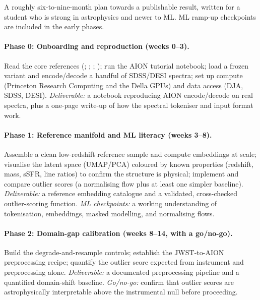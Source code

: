 \documentclass[onecolumn,astrosymb,tighten,longbib,trackchanges]{aastex7} %
\newcommand{\aion}{\textsc{AION}\xspace}
\begin{document}
A roughly six-to-nine-month plan towards a publishable result, written for a student who is strong in
astrophysics and newer to ML. ML ramp-up checkpoints are included in the early phases.

\paragraph{Phase 0: Onboarding and reproduction (weeks 0--3).} Read the core references
(\citealt{Parker2025_AION_omnimodal}; \citealt{Liang2023_outlier_detection};
\citealt{Bian2016_local_analogues}; \citealt{Hayes2025_highz_UV}); run the \aion tutorial notebook;
load a frozen variant and encode/decode a handful of SDSS/DESI spectra; set up compute (Princeton
Research Computing and the Della GPUs) and data access (DJA, SDSS, DESI). \emph{Deliverable:} a
notebook reproducing \aion encode/decode on real spectra, plus a one-page write-up of how the
spectral tokeniser and input format work.

\paragraph{Phase 1: Reference manifold and ML literacy (weeks 3--8).} Assemble a clean
low-redshift reference sample and compute embeddings at scale; visualise the latent space
(UMAP/PCA) coloured by known properties (redshift, mass, sSFR, line ratios) to confirm the structure
is physical; implement and compare outlier scores (a normalising flow plus at least one simpler
baseline). \emph{Deliverable:} a reference embedding catalogue and a validated, cross-checked
outlier-scoring function. \emph{ML checkpoints:} a working understanding of tokenisation, embeddings,
masked modelling, and normalising flows.

\paragraph{Phase 2: Domain-gap calibration (weeks 8--14, with a go/no-go).} Build the
degrade-and-resample controls; establish the JWST-to-\aion preprocessing recipe; quantify the
outlier score expected from instrument and preprocessing alone. \emph{Deliverable:} a documented
preprocessing pipeline and a quantified domain-shift baseline. \emph{Go/no-go:} confirm that outlier
scores are astrophysically interpretable above the instrumental null before proceeding.
\end{document}
